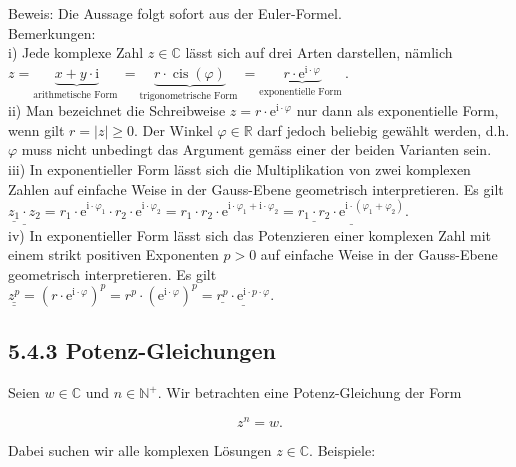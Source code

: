 \documentclass[10pt]{article}
\begin{document}
Beweis: Die Aussage folgt sofort aus der Euler-Formel.\\
Bemerkungen:\\
i) Jede komplexe Zahl $z \in \mathbb{C}$ lässt sich auf drei Arten darstellen, nämlich\\
$z=\underbrace{x+y \cdot \mathrm{i}}_{\text {arithmetische Form }}=\underbrace{r \cdot \operatorname{cis}(\varphi)}_{\text {trigonometrische Form }}=\underbrace{r \cdot \mathrm{e}^{\mathrm{i} \cdot \varphi}}_{\text {exponentielle Form }}$.\\
ii) Man bezeichnet die Schreibweise $z=r \cdot \mathrm{e}^{\mathrm{i} \cdot \varphi}$ nur dann als exponentielle Form, wenn gilt $r=|z| \geq 0$. Der Winkel $\varphi \in \mathbb{R}$ darf jedoch beliebig gewählt werden, d.h. $\varphi$ muss nicht unbedingt das Argument gemäss einer der beiden Varianten sein.\\
iii) In exponentieller Form lässt sich die Multiplikation von zwei komplexen Zahlen auf einfache Weise in der Gauss-Ebene geometrisch interpretieren. Es gilt\\
$\underline{\underline{z_{1}} \cdot z_{2}}=r_{1} \cdot \mathrm{e}^{\mathrm{i} \cdot \varphi_{1}} \cdot r_{2} \cdot \mathrm{e}^{\mathrm{i} \cdot \varphi_{2}}=r_{1} \cdot r_{2} \cdot \mathrm{e}^{\mathrm{i} \cdot \varphi_{1}+\mathrm{i} \cdot \varphi_{2}}=\underline{\underline{r_{1} \cdot r_{2}} \cdot \mathrm{e}^{\mathrm{i} \cdot\left(\varphi_{1}+\varphi_{2}\right)}}$.\\
iv) In exponentieller Form lässt sich das Potenzieren einer komplexen Zahl mit einem strikt positiven Exponenten $p>0$ auf einfache Weise in der Gauss-Ebene geometrisch interpretieren. Es gilt\\
$\underline{\underline{z^{p}}}=\left(r \cdot \mathrm{e}^{\mathrm{i} \cdot \varphi}\right)^{p}=r^{p} \cdot\left(\mathrm{e}^{\mathrm{i} \cdot \varphi}\right)^{p}=\underline{\underline{r^{p}} \cdot \mathrm{e}^{\mathrm{i} \cdot p \cdot \varphi}}$.

\subsection*{5.4.3 Potenz-Gleichungen}
Seien $w \in \mathbb{C}$ und $n \in \mathbb{N}^{+}$. Wir betrachten eine Potenz-Gleichung der Form


\begin{equation*}
z^{n}=w . \tag{5.34}
\end{equation*}


Dabei suchen wir alle komplexen Lösungen $z \in \mathbb{C}$. Beispiele:
\end{document}
